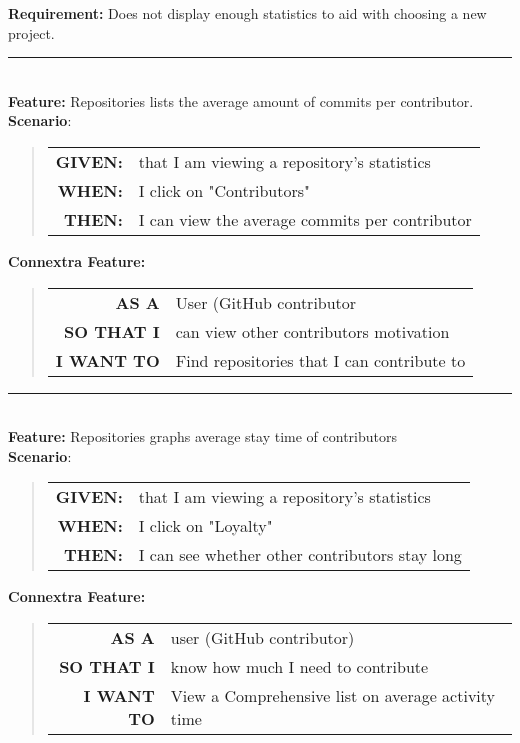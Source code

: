 \documentclass[12pt]{article}
\newcommand{\Requirement}[1] {
   \noindent \textbf{Requirement:} #1
}
\newcommand{\Feature}[1]{ 
   \noindent \textbf{Feature:} #1
}
\newcommand{\CFeature}[4]{
\noindent \textbf{Connextra Feature:}
	\begin{quote}
	\begin{tabular}{rl}
	\textbf{AS A} & #1\\
	\textbf{SO THAT \uppercase{#2}} & #3\\
	\textbf{\uppercase{#2} WANT TO} & #4  
	\end{tabular}
	\end{quote}
}
\newcommand{\GivenSc} {
	\noindent \textbf{GIVEN:}
	}
\newcommand{\WhenSc} {
	\noindent \textbf{WHEN:}
	}
\newcommand{\AndSc} {
	\noindent \textbf{AND:}
	}
\newcommand{\ThenSc} {
	\noindent \textbf{THEN:}
	}
\begin{document}
\begin{framed}
\Requirement{Does not display enough statistics to aid with choosing a new project.}\\[0.2cm]

\hrule~\\

\Feature{Repositories lists the average amount of commits per contributor.}\\[0.2cm]

\noindent \textbf{Scenario}:
\begin{quote}
\begin{tabular}{rl}
\GivenSc & that I am viewing a repository's statistics\\
\WhenSc & I click on "Contributors"\\
\ThenSc & I can view the average commits per contributor
\end{tabular}
\end{quote}

\CFeature{User (\textsf{GitHub} contributor}{I}{can view other contributors motivation}{Find repositories that I can contribute to}

\hrule~\\

\Feature{Repositories graphs average stay time of contributors}\\[0.4cm]

\noindent \textbf{Scenario}:
\begin{quote}
\begin{tabular}{rl}
\GivenSc & that I am viewing a repository's statistics\\
\WhenSc & I click on "Loyalty"\\
\ThenSc & I can see whether other contributors stay long
\end{tabular}
\end{quote}

\CFeature{user (\textsf{GitHub} contributor)}{I}{know how much I need to contribute}{View a Comprehensive list on average activity time}
\
\end{framed}
\end{document}
